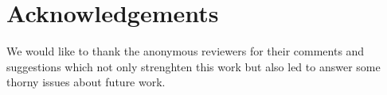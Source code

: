 
\section{Acknowledgements}
We would like to thank the anonymous reviewers for their comments and
suggestions which not only strenghten this work but also led to answer some
thorny issues about future work.

